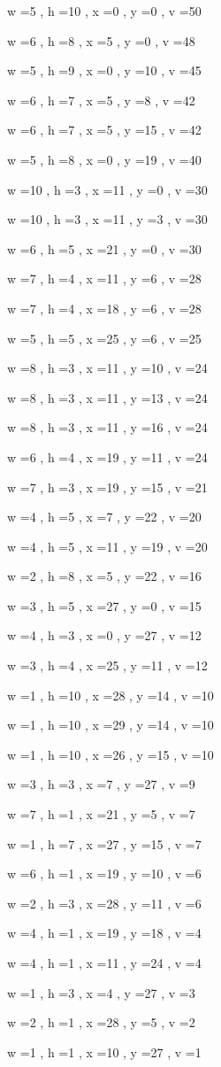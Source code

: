 \documentclass[11pt]{article}
\begin{document}
w =5 , h =10 , x =0 , y =0 , v =50
\par
w =6 , h =8 , x =5 , y =0 , v =48
\par
w =5 , h =9 , x =0 , y =10 , v =45
\par
w =6 , h =7 , x =5 , y =8 , v =42
\par
w =6 , h =7 , x =5 , y =15 , v =42
\par
w =5 , h =8 , x =0 , y =19 , v =40
\par
w =10 , h =3 , x =11 , y =0 , v =30
\par
w =10 , h =3 , x =11 , y =3 , v =30
\par
w =6 , h =5 , x =21 , y =0 , v =30
\par
w =7 , h =4 , x =11 , y =6 , v =28
\par
w =7 , h =4 , x =18 , y =6 , v =28
\par
w =5 , h =5 , x =25 , y =6 , v =25
\par
w =8 , h =3 , x =11 , y =10 , v =24
\par
w =8 , h =3 , x =11 , y =13 , v =24
\par
w =8 , h =3 , x =11 , y =16 , v =24
\par
w =6 , h =4 , x =19 , y =11 , v =24
\par
w =7 , h =3 , x =19 , y =15 , v =21
\par
w =4 , h =5 , x =7 , y =22 , v =20
\par
w =4 , h =5 , x =11 , y =19 , v =20
\par
w =2 , h =8 , x =5 , y =22 , v =16
\par
w =3 , h =5 , x =27 , y =0 , v =15
\par
w =4 , h =3 , x =0 , y =27 , v =12
\par
w =3 , h =4 , x =25 , y =11 , v =12
\par
w =1 , h =10 , x =28 , y =14 , v =10
\par
w =1 , h =10 , x =29 , y =14 , v =10
\par
w =1 , h =10 , x =26 , y =15 , v =10
\par
w =3 , h =3 , x =7 , y =27 , v =9
\par
w =7 , h =1 , x =21 , y =5 , v =7
\par
w =1 , h =7 , x =27 , y =15 , v =7
\par
w =6 , h =1 , x =19 , y =10 , v =6
\par
w =2 , h =3 , x =28 , y =11 , v =6
\par
w =4 , h =1 , x =19 , y =18 , v =4
\par
w =4 , h =1 , x =11 , y =24 , v =4
\par
w =1 , h =3 , x =4 , y =27 , v =3
\par
w =2 , h =1 , x =28 , y =5 , v =2
\par
w =1 , h =1 , x =10 , y =27 , v =1
\par
\newpage
\end{document}
